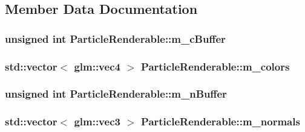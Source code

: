 \subsection{Member Data Documentation}
\hypertarget{classParticleRenderable_abe8e83a99746edd15b7611b8073c6ea9}{
\subsubsection[{m\+\_\+c\+Buffer}]{\setlength{\rightskip}{0pt plus 5cm}unsigned int Particle\+Renderable\+::m\+\_\+c\+Buffer\hspace{0.3cm}{\ttfamily [private]}}}\label{classParticleRenderable_abe8e83a99746edd15b7611b8073c6ea9}
\hypertarget{classParticleRenderable_a8eb17ca66cfe99d7d23fe054d1ba14d5}{
\subsubsection[{m\+\_\+colors}]{\setlength{\rightskip}{0pt plus 5cm}std\+::vector$<$ glm\+::vec4 $>$ Particle\+Renderable\+::m\+\_\+colors\hspace{0.3cm}{\ttfamily [private]}}}\label{classParticleRenderable_a8eb17ca66cfe99d7d23fe054d1ba14d5}
\hypertarget{classParticleRenderable_adc8135a6d1f34037dcf942cf10cb296b}{
\subsubsection[{m\+\_\+n\+Buffer}]{\setlength{\rightskip}{0pt plus 5cm}unsigned int Particle\+Renderable\+::m\+\_\+n\+Buffer\hspace{0.3cm}{\ttfamily [private]}}}\label{classParticleRenderable_adc8135a6d1f34037dcf942cf10cb296b}
\hypertarget{classParticleRenderable_a816b9593b39a4f21d837bd0fbebd393e}{
\subsubsection[{m\+\_\+normals}]{\setlength{\rightskip}{0pt plus 5cm}std\+::vector$<$ glm\+::vec3 $>$ Particle\+Renderable\+::m\+\_\+normals\hspace{0.3cm}{\ttfamily [private]}}}\label{classParticleRenderable_a816b9593b39a4f21d837bd0fbebd393e}
